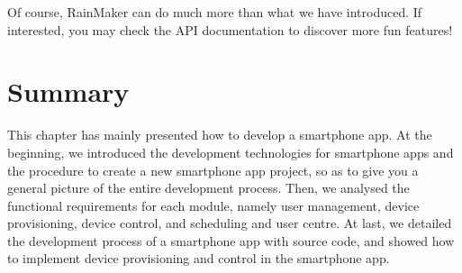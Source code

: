 \documentclass[a4paper,12pt]{book}
\begin{document}
Of course, RainMaker can do much more than what we have introduced. If interested, you may check the API documentation to discover more fun features!

\section{Summary}
This chapter has mainly presented how to develop a smartphone app. At the beginning, we introduced the development technologies for smartphone apps and the procedure to create a new smartphone app project, so as to give you a general picture of the entire development process. Then, we analysed the functional requirements for each module, namely user management, device provisioning, device control, and scheduling and user centre. At last, we detailed the development process of a smartphone app with source code, and showed how to implement device provisioning and control in the smartphone app.
\end{document}
